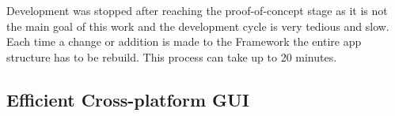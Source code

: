
Development was stopped after reaching the proof-of-concept stage as it is not the main goal of this work and the development cycle is very tedious and slow. Each time a change or addition is made to the Framework the entire app structure has to be rebuild. This process can take up to 20 minutes. 


\subsection{Efficient Cross-platform GUI}


